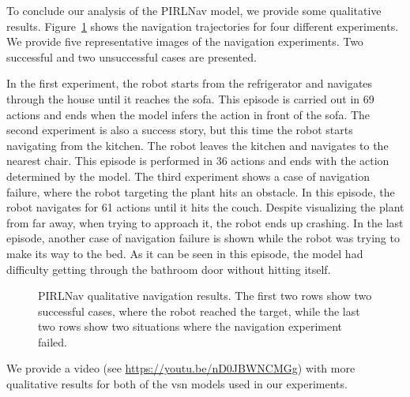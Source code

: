 To conclude our analysis of the PIRLNav model, we provide some qualitative results.
Figure~\ref{fig:pirlnav_qualitative} shows the navigation trajectories for four different experiments.
We provide five representative images of the navigation experiments.
Two successful and two unsuccessful cases are presented.

In the first experiment, the robot starts from the refrigerator and navigates through the house until it reaches the sofa.
This episode is carried out in 69 actions and ends when the model infers the action \stopac in front of the sofa.
The second experiment is also a success story, but this time the robot starts navigating from the kitchen.
The robot leaves the kitchen and navigates to the nearest chair.
This episode is performed in 36 actions and ends with the \stopac action determined by the model.
The third experiment shows a case of navigation failure, where the robot targeting the plant hits an obstacle.
In this episode, the robot navigates for 61 actions until it hits the couch.
Despite visualizing the plant from far away, when trying to approach it, the robot ends up crashing.
In the last episode, another case of navigation failure is shown while the robot was trying to make its way to the bed.
As it can be seen in this episode, the model had difficulty getting through the bathroom door without hitting itself.

\begin{figure}
    \centering
        \caption{PIRLNav qualitative navigation results. The first two rows show two successful cases, where the robot reached the target, while the last two rows show two situations where the navigation experiment failed.}
        \label{fig:pirlnav_qualitative}
\end{figure}

We provide a video (see \url{https://youtu.be/nD0JBWNCMGg}) with more qualitative results for both of the \acrshort{vsn} models used in our experiments.

